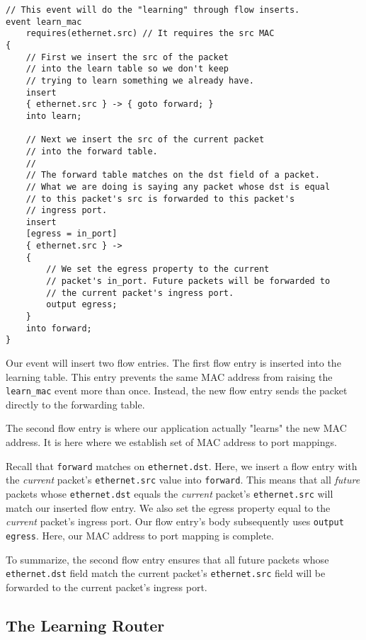 \begin{codepage}
\begin{lstlisting}
// This event will do the "learning" through flow inserts.
event learn_mac
	requires(ethernet.src) // It requires the src MAC
{
	// First we insert the src of the packet
	// into the learn table so we don't keep
	// trying to learn something we already have.
	insert
	{ ethernet.src } -> { goto forward; }
	into learn;
	
	// Next we insert the src of the current packet 
	// into the forward table.
	//
	// The forward table matches on the dst field of a packet. 
	// What we are doing is saying any packet whose dst is equal
	// to this packet's src is forwarded to this packet's
	// ingress port.
	insert
	[egress = in_port]
	{ ethernet.src } ->
	{
		// We set the egress property to the current
		// packet's in_port. Future packets will be forwarded to
		// the current packet's ingress port.
		output egress;
	}
	into forward;
}
\end{lstlisting}
\end{codepage}

Our event will insert two flow entries. The first flow entry is inserted into the learning table. This entry prevents the same MAC address from raising the \texttt{learn\_mac} event more than once. Instead, the new flow entry sends the packet directly to the forwarding table.

The second flow entry is where our application actually "learns" the new MAC address. It is here where we establish set of MAC address to port mappings.

Recall that \texttt{forward} matches on \texttt{ethernet.dst}. Here, we insert a flow entry with the \textit{current} packet's \texttt{ethernet.src} value into \texttt{forward}. This means that all \textit{future} packets whose \texttt{ethernet.dst} equals the \textit{current} packet's \texttt{ethernet.src} will match our inserted flow entry. We also set the egress property equal to the \textit{current} packet's ingress port. Our flow entry's body subsequently uses \texttt{output egress}. Here, our MAC address to port mapping is complete.

To summarize, the second flow entry ensures that all future packets whose \texttt{ethernet.dst} field match the current packet's \texttt{ethernet.src} field will be forwarded to the current packet's ingress port.

\subsection{The Learning Router} \label{tut:learning_router}

